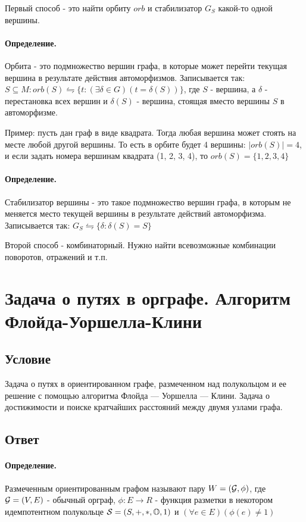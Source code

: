 \documentclass{report}
\begin{document}
Первый способ - это найти орбиту $orb$ и стабилизатор  $G_{S}$ какой-то одной вершины.

\paragraph*{Определение.}
Орбита - это подмножество вершин графа, в которые может перейти текущая вершина в результате
действия автоморфизмов.
Записывается так: $S \subseteq M: orb(S) \leftrightharpoons
\{t: (\exists \delta \in G)(t = \delta(S))\}$, где $S$ - вершина, а $\delta$
- перестановка всех вершин и $\delta(S)$ - вершина, стоящая вместо вершины  $S$ в
автоморфизме.

Пример: пусть дан граф в виде квадрата. Тогда любая вершина может стоять на месте любой другой
вершины. То есть в орбите будет 4 вершины: $ \mid orb(S)  \mid  = 4$, и если задать номера вершинам
квадрата (1, 2, 3, 4), то $orb(S) = \{1,2,3,4\} $

\paragraph*{Определение.}
Стабилизатор вершины - это такое подмножество вершин графа, в которым не меняется
место текущей вершины в результате действий автоморфизма.
Записывается так: $G_{S} \leftrightharpoons
\{\delta: \delta(S) = S\} $

\medskip
Второй способ - комбинаторный. Нужно найти всевозможные комбинации поворотов, отражений и т.п.

\newpage

\section{Задача о путях в орграфе. Алгоритм Флойда-Уоршелла-Клини}
\subsection{Условие}
Задача о путях в ориентированном графе, размеченном над полукольцом и ее решение
с помощью алгоритма Флойда — Уоршелла — Клини. Задача о достижимости и поиске
кратчайших расстояний между двумя узлами графа.

\subsection{Ответ}

\paragraph*{Определение.}
Размеченным ориентированным графом называют пару $W = ( {\cal G}, \phi )$, где
$ {\cal G} = (V, E)$ - обычный орграф, $\phi: E \to R$ - функция разметки в некотором идемпотентном
полукольце $ {\cal S} = (S, +, *, \mathbb{O}, 1)$ и $(\forall e \in E)(\phi(e) \neq 1)$
\end{document}
